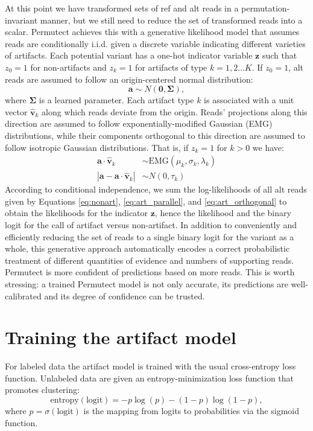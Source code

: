 \documentclass[times, twoside, watermark]{StyleBioRxiv}
\begin{document}
At this point we have transformed sets of ref and alt reads in a permutation-invariant manner, but we still need to reduce the set of transformed reads into a scalar.  Permutect achieves this with a generative likelihood model that assumes reads are conditionally i.i.d. given a discrete variable indicating different varieties of artifacts.  Each potential variant has a one-hot indicator variable $\mathbf{z}$ such that $z_0 = 1$ for non-artifacts and $z_k = 1$ for artifacts of type $k = 1, 2 \ldots K$.  If $z_0 = 1$, alt reads are assumed to follow an origin-centered normal distribution:
\begin{equation}
\mathbf{a} \sim N(\mathbf{0}, \mathbf{\Sigma}), \label{eq:nonart}
\end{equation}
where $\mathbf{\Sigma}$ is a learned parameter.  Each artifact type $k$ is associated with a unit vector $\hat{\mathbf{v}}_k$ along which reads deviate from the origin.  Reads' projections along this direction are assumed to follow exponentially-modified Gaussian (EMG) distributions, while their components orthogonal to this direction are assumed to follow isotropic Gaussian distributions.  That is, if $z_k = 1$ for $k > 0$ we have:
\begin{align}
\mathbf{a} \cdot \hat{\mathbf{v}}_k &\sim \mathrm{EMG}(\mu_k, \sigma_k, \lambda_k) \label{eq:art_parallel} \\
|\mathbf{a} - \mathbf{a} \cdot \hat{\mathbf{v}}_k| &\sim N(0, \tau_k) \label{eq:art_orthogonal}
\end{align} 
According to conditional independence, we sum the log-likelihoods of all alt reads given by Equations \ref{eq:nonart}, \ref{eq:art_parallel}, and \ref{eq:art_orthogonal} to obtain the likelihoods for the indicator $\mathbf{z}$, hence the likelihood and the binary logit for the call of artifact versus non-artifact.  In addition to conveniently and efficiently reducing the set of reads to a single binary logit for the variant as a whole, this generative approach automatically encodes a correct probabilistic treatment of different quantities of evidence and numbers of supporting reads.  Permutect is more confident of predictions based on more reads.  This is worth stressing: a trained Permutect model is not only accurate, its predictions are well-calibrated and its degree of confidence can be trusted.


\section*{Training the artifact model}
For labeled data the artifact model is trained with the usual cross-entropy loss function.  Unlabeled data are given an entropy-minimization loss function that promotes clustering:
\begin{equation}
    \mathrm{entropy}(\mathrm{logit}) = -p \log(p) - (1-p) \log(1-p),
\end{equation}
where $p = \sigma(\mathrm{logit})$ is the mapping from logits to probabilities via the sigmoid function.
\end{document}
